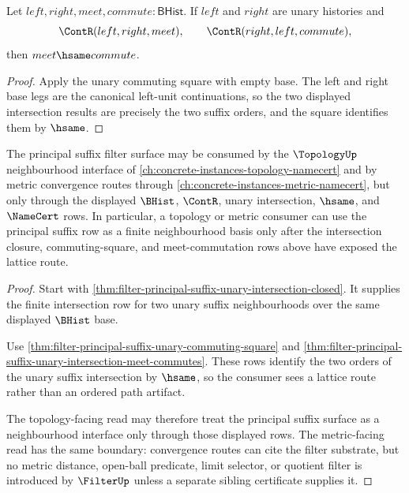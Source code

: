 \begin{theorem}
\label{thm:filter-principal-suffix-unary-intersection-meet-commutes}
Let $left,right,meet,commute:\mathsf{BHist}$. If $left$ and $right$ are unary
histories and
$$
\ContR(left,right,meet),\qquad
\ContR(right,left,commute),
$$
then $meet\hsame commute$.
\end{theorem}
\begin{proof}
Apply the unary commuting square with empty base. The left and right base legs
are the canonical left-unit continuations, so the two displayed intersection
results are precisely the two suffix orders, and the square identifies them by
$\hsame$.
\end{proof}

\begin{theorem}
\label{thm:filter-principal-suffix-topology-lattice-route}
The principal suffix filter surface may be consumed by the $\TopologyUp$ neighbourhood interface of \autoref{ch:concrete-instances-topology-namecert} and by metric convergence routes through \autoref{ch:concrete-instances-metric-namecert}, but only through the displayed $\BHist$, $\ContR$, unary intersection, $\hsame$, and $\NameCert$ rows. In particular, a topology or metric consumer can use the principal suffix row as a finite neighbourhood basis only after the intersection closure, commuting-square, and meet-commutation rows above have exposed the lattice route.
\end{theorem}
\begin{proof}
Start with \autoref{thm:filter-principal-suffix-unary-intersection-closed}. It supplies the finite intersection row for two unary suffix neighbourhoods over the same displayed $\BHist$ base.

Use \autoref{thm:filter-principal-suffix-unary-commuting-square} and \autoref{thm:filter-principal-suffix-unary-intersection-meet-commutes}. These rows identify the two orders of the unary suffix intersection by $\hsame$, so the consumer sees a lattice route rather than an ordered path artifact.

The topology-facing read may therefore treat the principal suffix surface as a neighbourhood interface only through those displayed rows. The metric-facing read has the same boundary: convergence routes can cite the filter substrate, but no metric distance, open-ball predicate, limit selector, or quotient filter is introduced by $\FilterUp$ unless a separate sibling certificate supplies it.
\end{proof}

